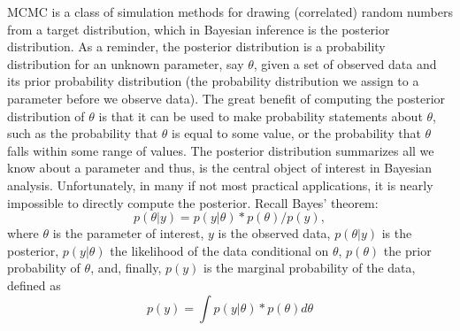 MCMC is a class of simulation methods for
drawing (correlated) random numbers from a target distribution, which
in Bayesian inference is the posterior distribution.
As a reminder, the posterior distribution is a probability
distribution for an unknown parameter, say $\theta$, given a set of
observed data and its prior probability distribution (the probability
distribution we assign to a parameter before we observe data).  The
great benefit of computing the posterior distribution of $\theta$ is
that it can be used to make probability statements about $\theta$,
such as the probability that $\theta$ is equal to some value, or the
probability that $\theta$ falls within some range of values. 
The posterior distribution summarizes all we know about a parameter
and thus, is the central object of interest in Bayesian
analysis. Unfortunately, in many if not most practical applications,
it is nearly impossible to directly compute the posterior. Recall
Bayes’ theorem:
\begin{equation}
p(\theta|y) = p(y|\theta) * p(\theta) / p(y),
\label{mcmc.eq.bayes}
\end{equation}
where $\theta$ is the parameter of interest, $y$ is the observed data,
$p(\theta|y)$ is the posterior, $p(y|\theta)$ the likelihood of the
data conditional on $\theta$, $p(\theta)$ the prior probability of
$\theta$, and, finally, $p(y)$ is the marginal probability of the
data, defined as 
\[
p(y) = \int p(y|\theta) * p(\theta) d\theta
\]

